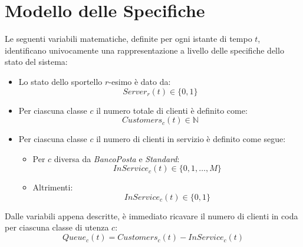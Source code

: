 \chapter{Modello delle Specifiche}\label{chp:modello-specifiche}
Le seguenti variabili matematiche, definite per ogni istante di tempo $t$, identificano univocamente una rappresentazione a livello delle specifiche dello stato del sistema:

\begin{itemize}
\item Lo stato dello sportello $r$-esimo è dato da:
\begin{equation}
Server_r(t) \in \lbrace 0, 1 \rbrace
\end{equation}
\item Per ciascuna classe $c$ il numero totale di clienti è definito come:
\begin{equation}
Customers_c(t) \in \mathbb{N}
\end{equation}
\item Per ciascuna classe $c$ il numero di clienti in servizio è definito come segue:
\begin{itemize}
\item Per $c$ diversa da \sr{} \textsl{BancoPosta} e \sr{} \textsl{Standard}:
\begin{equation}
InService_c(t) \in \lbrace 0, 1, \dots, M \rbrace
\end{equation}
\item Altrimenti:
\begin{equation}
InService_c(t) \in \lbrace 0, 1 \rbrace
\end{equation}
\end{itemize}
\end{itemize}

Dalle variabili appena descritte, è immediato ricavare il numero di clienti in coda per ciascuna classe di utenza $c$:
\begin{equation}
Queue_c(t) = Customers_c(t) - InService_c(t)
\end{equation}

